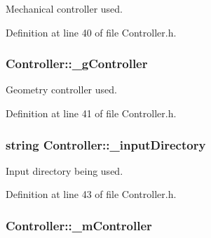 Mechanical controller used. 



Definition at line 40 of file Controller.\+h.

\hypertarget{classController_aa3ad741715e044ec7501b23c885bba57}{
\subsubsection[{\+\_\+g\+Controller}]{ Controller\+::\+\_\+g\+Controller\hspace{0.3cm}{\ttfamily [private]}}}\label{classController_aa3ad741715e044ec7501b23c885bba57}


Geometry controller used. 



Definition at line 41 of file Controller.\+h.

\hypertarget{classController_a0a7ccbe9ed377d7b12fde93c86b97da1}{
\subsubsection[{\+\_\+input\+Directory}]{\setlength{\rightskip}{0pt plus 5cm}string Controller\+::\+\_\+input\+Directory\hspace{0.3cm}{\ttfamily [private]}}}\label{classController_a0a7ccbe9ed377d7b12fde93c86b97da1}


Input directory being used. 



Definition at line 43 of file Controller.\+h.

\hypertarget{classController_a14e932b02f4c7029bfc1db1ad873d439}{
\subsubsection[{\+\_\+m\+Controller}]{ Controller\+::\+\_\+m\+Controller\hspace{0.3cm}{\ttfamily [private]}}}\label{classController_a14e932b02f4c7029bfc1db1ad873d439}



